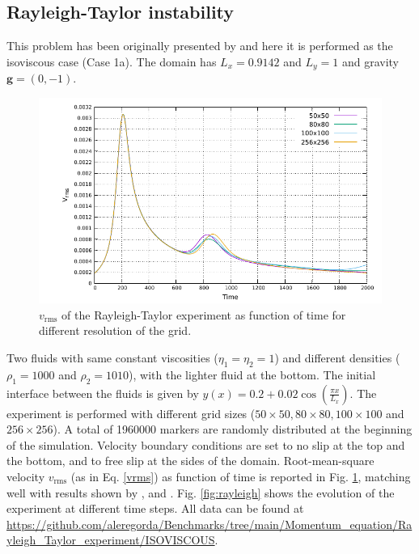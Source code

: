 \subsection{Rayleigh-Taylor instability}\label{sec:rayleigh}
This problem has been originally presented by \citet{vanKeken1997} and here it is performed as the isoviscous case (Case 1a). The domain has $L_x=0.9142$ and $L_y=1$ and gravity $\bm{g}=(0,-1)$.

\begin{figure}
\includegraphics[width=12cm]{./Figures/RT.pdf}
\caption{$v_{\textrm{rms}}$ of the Rayleigh-Taylor experiment as function of time for different resolution of the grid.}
\label{fig:RT}
\end{figure}
Two fluids with same constant viscosities ($\eta_1=\eta_2=1$) and different densities ($\rho_1=1000$ and $\rho_2=1010$), with the lighter fluid at the bottom.
The initial interface between the fluids is given by $y(x)=0.2+0.02 \cos \left(\frac{\pi x}{L_x}\right)$. The experiment is performed with different grid sizes ($50\times50, 80\times80, 100\times100$ and $256\times256$). A total of 1960000 markers are randomly distributed at the beginning of the simulation. Velocity boundary conditions are set to no slip at the top and the bottom, and to free slip at the sides of the domain.
Root-mean-square velocity $v_{\textrm{rms}}$ (as in Eq. \ref{vrms}) as function of time is reported in Fig. \ref{fig:RT}, matching well with results shown by \citet{vanKeken1997}, \citet{Tackley2003} and
\citet{Thieulot2014}. Fig. \ref{fig:rayleigh} shows the evolution of the experiment at different time steps. All data can be found at  \url{https://github.com/aleregorda/Benchmarks/tree/main/Momentum_equation/Rayleigh_Taylor_experiment/ISOVISCOUS}.
